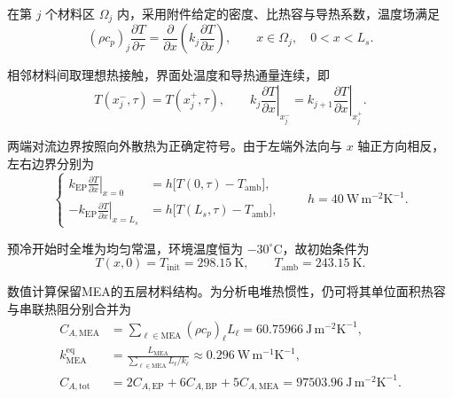 在第 $j$ 个材料区 $\Omega_j$ 内，采用附件给定的密度、比热容与导热系数，温度场满足
\begin{equation}
(\rho c_p)_j\frac{\partial T}{\partial\tau}
=\frac{\partial}{\partial x}\left(k_j\frac{\partial T}{\partial x}\right),
\qquad x\in\Omega_j,\quad 0<x<L_s.
\tag{7-2}\label{eq:q4:precool_pde}
\end{equation}

相邻材料间取理想热接触，界面处温度和导热通量连续，即
\begin{equation}
T(x_j^-,\tau)=T(x_j^+,\tau),\qquad
k_j\left.\frac{\partial T}{\partial x}\right|_{x_j^-}
=k_{j+1}\left.\frac{\partial T}{\partial x}\right|_{x_j^+}.
\tag{7-3}\label{eq:q4:precool_interface}
\end{equation}

两端对流边界按照向外散热为正确定符号。由于左端外法向与 $x$ 轴正方向相反，左右边界分别为
\begin{equation}
\left\{\begin{aligned}
k_{\mathrm{EP}}\left.\frac{\partial T}{\partial x}\right|_{x=0}
&=h\big[T(0,\tau)-T_{\mathrm{amb}}\big],\\
-k_{\mathrm{EP}}\left.\frac{\partial T}{\partial x}\right|_{x=L_s}
&=h\big[T(L_s,\tau)-T_{\mathrm{amb}}\big],
\end{aligned}\right.
\qquad h=40\ \mathrm{W\,m^{-2}K^{-1}}.
\tag{7-4}\label{eq:q4:precool_robin}
\end{equation}

预冷开始时全堆为均匀常温，环境温度恒为 $-30^\circ\mathrm C$，故初始条件为
\begin{equation}
T(x,0)=T_{\mathrm{init}}=298.15\ \mathrm K,\qquad
T_{\mathrm{amb}}=243.15\ \mathrm K.
\tag{7-5}\label{eq:q4:precool_initial}
\end{equation}

数值计算保留MEA的五层材料结构。为分析电堆热惯性，仍可将其单位面积热容与串联热阻分别合并为
\begin{equation}
\begin{aligned}
C_{A,\mathrm{MEA}}&=\sum_{\ell\in\mathrm{MEA}}(\rho c_p)_\ell L_\ell
=60.75966\ \mathrm{J\,m^{-2}K^{-1}},\\
k_{\mathrm{MEA}}^{\mathrm{eq}}&=\frac{L_{\mathrm{MEA}}}{\displaystyle\sum_{\ell\in\mathrm{MEA}}L_\ell/k_\ell}
\approx0.296\ \mathrm{W\,m^{-1}K^{-1}},\\
C_{A,\mathrm{tot}}&=2C_{A,\mathrm{EP}}+6C_{A,\mathrm{BP}}+5C_{A,\mathrm{MEA}}
=97503.96\ \mathrm{J\,m^{-2}K^{-1}}.
\end{aligned}
\tag{7-6}\label{eq:q4:precool_capacity}
\end{equation}

